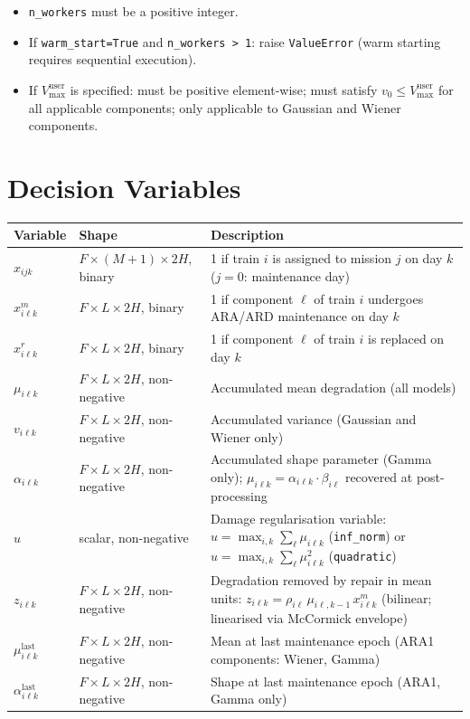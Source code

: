 \documentclass[11pt,a4paper]{article}
\begin{document}
\begin{itemize}[leftmargin=1.5em]
        $H_{\max} > H_{\min}$.
  \item \texttt{n\_workers} must be a positive integer.
  \item If \texttt{warm\_start=True} and \texttt{n\_workers > 1}: raise
        \texttt{ValueError} (warm starting requires sequential execution).
  \item If $V_{\max}^{\mathrm{user}}$ is specified: must be positive element-wise;
        must satisfy $v_0 \leq V_{\max}^{\mathrm{user}}$ for all applicable components;
        only applicable to Gaussian and Wiener components.
\end{itemize}

\section{Decision Variables}

\begin{longtable}{@{}llp{8cm}@{}}
\toprule
Variable & Shape & Description \\
\midrule
$x_{ijk}$ & $F \times (M{+}1) \times 2H$, binary
  & 1 if train $i$ is assigned to mission $j$ on day $k$
    ($j=0$: maintenance day) \\
$x^m_{i\ell k}$ & $F \times L \times 2H$, binary
  & 1 if component $\ell$ of train $i$ undergoes ARA/ARD maintenance on day $k$ \\
$x^r_{i\ell k}$ & $F \times L \times 2H$, binary
  & 1 if component $\ell$ of train $i$ is replaced on day $k$ \\
$\mu_{i\ell k}$ & $F \times L \times 2H$, non-negative
  & Accumulated mean degradation (all models) \\
$v_{i\ell k}$ & $F \times L \times 2H$, non-negative
  & Accumulated variance (Gaussian and Wiener only) \\
$\alpha_{i\ell k}$ & $F \times L \times 2H$, non-negative
  & Accumulated shape parameter (Gamma only);
    $\mu_{i\ell k} = \alpha_{i\ell k}\cdot\beta_{i\ell}$ recovered at post-processing \\
$u$ & scalar, non-negative
  & Damage regularisation variable:
    $u = \max_{i,k}\sum_\ell \mu_{i\ell k}$ (\texttt{inf\_norm}) or
    $u = \max_{i,k}\sum_\ell \mu_{i\ell k}^2$ (\texttt{quadratic}) \\
$z_{i\ell k}$ & $F \times L \times 2H$, non-negative
  & Degradation removed by repair in mean units:
    $z_{i\ell k} = \rho_{i\ell}\,\mu_{i\ell,k-1}\,x^m_{i\ell k}$
    (bilinear; linearised via McCormick envelope) \\
$\mu^{\mathrm{last}}_{i\ell k}$ & $F \times L \times 2H$, non-negative
  & Mean at last maintenance epoch (ARA1 components: Wiener, Gamma) \\
$\alpha^{\mathrm{last}}_{i\ell k}$ & $F \times L \times 2H$, non-negative
  & Shape at last maintenance epoch (ARA1, Gamma only) \\
\bottomrule
\end{longtable}
\end{document}
